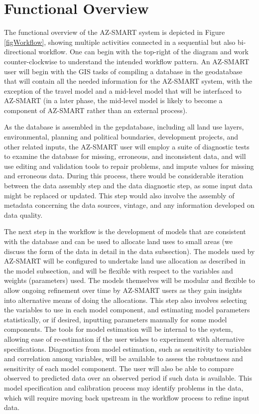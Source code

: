  \section{Functional Overview}
The functional overview of the AZ-SMART system is depicted in Figure
\ref{figWorkflow}, showing multiple activities connected in a
sequential but also bi-directional workflow.  One can begin with the
top-right of the diagram and work counter-clockwise to understand
the intended workflow pattern.  An AZ-SMART user will begin with the
GIS tasks of compiling a database in the geodatabase that will
contain all the needed information for the AZ-SMART system, with the
exception of the travel model and a mid-level model that will be
interfaced to AZ-SMART (in a later phase, the mid-level model is
likely to become a component of AZ-SMART rather than an external
process).

As the database is assembled in the gepdatabase, including all land use layers, environmental, planning and political boundaries,
development projects, and other related inputs, the AZ-SMART user will employ a suite of diagnostic tests to examine the database
for missing, erroneous, and inconsistent data, and will use editing and validation tools to repair problems, and impute values for
missing and erroneous data.  During this process, there would be considerable iteration between the data assembly step and the data
diagnostic step, as some input data might be replaced or updated.  This step would also involve the assembly of metadata concerning
the data sources, vintage, and any information developed on data quality.

The next step in the workflow is the development of models that are consistent with the database and can be used to allocate land
uses to small areas (we discuss the form of the data in detail in the data subsection).  The models used by AZ-SMART will be configured
to undertake land use allocation as described in the model subsection, and will be flexible with respect to the variables and weights
(parameters) used.  The models themselves will be modular and flexible to allow ongoing refinement over time by AZ-SMART users as they
gain insights into alternative means of doing the allocations.  This step also involves selecting the variables to use in each model
component, and estimating model parameters statistically, or if desired, inputting parameters manually for some model components.
The tools for model estimation will be internal to the system, allowing ease of re-estimation if the user wishes to experiment with
alternative specifications.  Diagnostics from model estimation, such as sensitivity to variables and correlation among variables,
will be available to assess the robustness and sensitivity of each model component.  The user will also be able to compare observed
to predicted data over an observed period if such data is available.  This model specification and calibration process may identify
problems in the data, which will require moving back upstream in the workflow process to refine input data.

